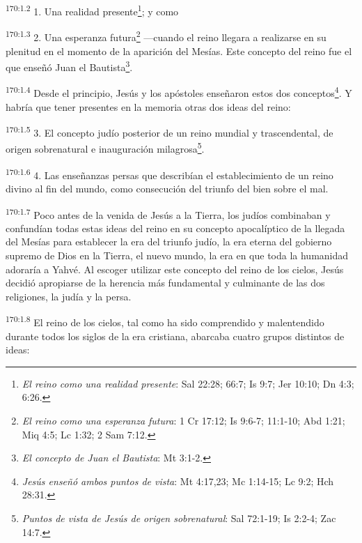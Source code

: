 \par 
\textsuperscript{170:1.2} 1. Una realidad presente\footnote{\textit{El reino como una realidad presente}: Sal 22:28; 66:7; Is 9:7; Jer 10:10; Dn 4:3; 6:26.}; y como

\par 
\textsuperscript{170:1.3} 2. Una esperanza futura\footnote{\textit{El reino como una esperanza futura}: 1 Cr 17:12; Is 9:6-7; 11:1-10; Abd 1:21; Miq 4:5; Lc 1:32; 2 Sam 7:12.} ---cuando el reino llegara a realizarse en su plenitud en el momento de la aparición del Mesías. Este concepto del reino fue el que enseñó Juan el Bautista\footnote{\textit{El concepto de Juan el Bautista}: Mt 3:1-2.}.

\par 
\textsuperscript{170:1.4} Desde el principio, Jesús y los apóstoles enseñaron estos dos conceptos\footnote{\textit{Jesús enseñó ambos puntos de vista}: Mt 4:17,23; Mc 1:14-15; Lc 9:2; Hch 28:31.}. Y habría que tener presentes en la memoria otras dos ideas del reino:

\par 
\textsuperscript{170:1.5} 3. El concepto judío posterior de un reino mundial y trascendental, de origen sobrenatural e inauguración milagrosa\footnote{\textit{Puntos de vista de Jesús de origen sobrenatural}: Sal 72:1-19; Is 2:2-4; Zac 14:7.}.

\par 
\textsuperscript{170:1.6} 4. Las enseñanzas persas que describían el establecimiento de un reino divino al fin del mundo, como consecución del triunfo del bien sobre el mal.

\par 
\textsuperscript{170:1.7} Poco antes de la venida de Jesús a la Tierra, los judíos combinaban y confundían todas estas ideas del reino en su concepto apocalíptico de la llegada del Mesías para establecer la era del triunfo judío, la era eterna del gobierno supremo de Dios en la Tierra, el nuevo mundo, la era en que toda la humanidad adoraría a Yahvé. Al escoger utilizar este concepto del reino de los cielos, Jesús decidió apropiarse de la herencia más fundamental y culminante de las dos religiones, la judía y la persa.

\par 
\textsuperscript{170:1.8} El reino de los cielos, tal como ha sido comprendido y malentendido durante todos los siglos de la era cristiana, abarcaba cuatro grupos distintos de ideas:


